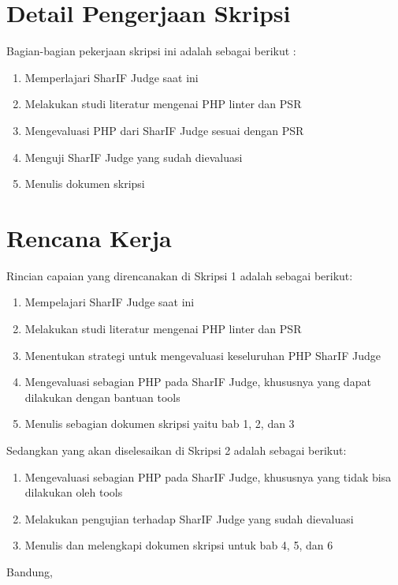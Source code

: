 \documentclass[a4paper,twoside]{article}
\begin{document}
\section{Detail Pengerjaan Skripsi}
Bagian-bagian pekerjaan skripsi ini adalah sebagai berikut :
	\begin{enumerate}
		\item Memperlajari SharIF Judge saat ini
		\item Melakukan studi literatur mengenai PHP linter dan PSR
		\item Mengevaluasi PHP dari SharIF Judge sesuai dengan PSR
		\item Menguji SharIF Judge yang sudah dievaluasi
		\item Menulis dokumen skripsi
	\end{enumerate}

\section{Rencana Kerja}
Rincian capaian yang direncanakan di Skripsi 1 adalah sebagai berikut:
\begin{enumerate}
\item Mempelajari SharIF Judge saat ini
\item Melakukan studi literatur mengenai PHP linter dan PSR
\item Menentukan strategi untuk mengevaluasi keseluruhan PHP SharIF Judge
\item Mengevaluasi sebagian PHP pada SharIF Judge, khususnya yang dapat dilakukan dengan bantuan tools
\item Menulis sebagian dokumen skripsi yaitu bab 1, 2, dan 3
\end{enumerate}

Sedangkan yang akan diselesaikan di Skripsi 2 adalah sebagai berikut:
\begin{enumerate}
\item Mengevaluasi sebagian PHP pada SharIF Judge, khususnya yang tidak bisa dilakukan oleh tools
\item Melakukan pengujian terhadap SharIF Judge yang sudah dievaluasi
\item Menulis dan melengkapi dokumen skripsi untuk bab 4, 5, dan 6

\end{enumerate}

\vspace{1cm}
\centering Bandung, \tanggal\\
\vspace{2cm} \nama \\ 
\vspace{1cm}
\end{document}
